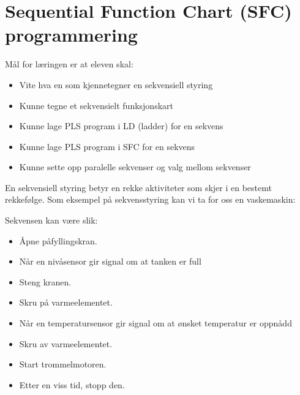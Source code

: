 \filbreak
\section{Sequential Function Chart (SFC) programmering}
\vskip 10pt

Mål for læringen er at eleven skal: 
\vskip 10pt
\begin{itemize}
	\item Vite hva en som kjennetegner en sekvensiell styring 
	\item Kunne tegne et sekvensielt funksjonskart 
	\item Kunne lage PLS program i LD (ladder) for en sekvens
	\item Kunne lage PLS program i SFC for en sekvens 
	\item Kunne sette opp paralelle sekvenser og valg mellom sekvenser
\end{itemize}
\vskip 10pt
En sekvensiell styring betyr en rekke aktiviteter som skjer i en bestemt rekkefølge.
\vskip 10pt
Som eksempel på sekvensstyring kan vi ta for oss en vaskemaskin: 

Sekvensen kan være slik: 

 \begin{itemize}
		\item Åpne påfyllingskran.
		\item Når en nivåsensor gir signal om at tanken er full
		\item Steng kranen.
		\item Skru på varmeelementet.
		\item Når en temperatursensor gir signal om at ønsket temperatur er oppnådd
		\item Skru av varmeelementet.
		\item Start trommelmotoren.
		\item Etter en viss tid, stopp den.
 \end{itemize} 

\vskip 10pt













